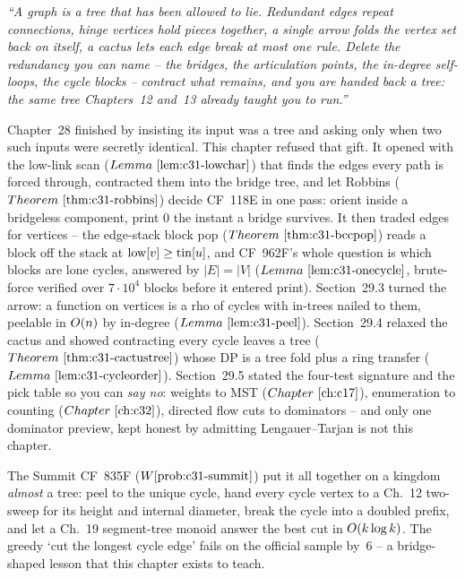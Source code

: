 \begin{lastword}
\emph{``A graph is a tree that has been allowed to lie.  Redundant edges repeat
connections, hinge vertices hold pieces together, a single arrow folds the vertex
set back on itself, a cactus lets each edge break at most one rule.  Delete the
redundancy you can name -- the bridges, the articulation points, the in-degree
self-loops, the cycle blocks -- contract what remains, and you are handed back a
tree: the same tree Chapters~12 and~13 already taught you to run.''}

\medskip
Chapter~28 finished by insisting its input was a tree and asking only when two
such inputs were secretly identical.  This chapter refused that gift.  It opened
with the low-link scan (\(\lemref{c31-lowchar}\)) that finds the edges every path is
forced through, contracted them into the bridge tree, and let Robbins
(\(\thmref{c31-robbins}\)) decide CF~118E in one pass: orient inside a bridgeless
component, print 0 the instant a bridge survives.  It then traded edges for
vertices -- the edge-stack block pop (\(\thmref{c31-bccpop}\)) reads a block off the
stack at \(\mathrm{low}[v]\ge\operatorname{tin}[u]\), and CF~962F's whole question is which blocks
are lone cycles, answered by \(|E|{=}|V|\) (\(\lemref{c31-onecycle}\), brute-force
verified over \(7\cdot 10^{4}\) blocks before it entered print).  Section~29.3 turned
the arrow: a function on vertices is a rho of cycles with in-trees nailed to them,
peelable in \(O(n)\) by in-degree (\(\lemref{c31-peel}\)).  Section~29.4 relaxed the
cactus and showed contracting every cycle leaves a tree (\(\thmref{c31-cactustree}\))
whose DP is a tree fold plus a ring transfer (\(\lemref{c31-cycleorder}\)).  Section~29.5
stated the four-test signature and the pick table so you can \emph{say no}: weights
to MST (\(\chref{c17}\)), enumeration to counting (\(\chref{c32}\)), directed flow cuts to
dominators -- and only one dominator preview, kept honest by admitting
Lengauer--Tarjan is not this chapter.

\medskip
The Summit CF~835F (\(\probref{c31-summit}\)) put it all together on a kingdom
\emph{almost} a tree: peel to the unique cycle, hand every cycle vertex to a Ch.~12
two-sweep for its height and internal diameter, break the cycle into a doubled
prefix, and let a Ch.~19 segment-tree monoid answer the best cut in
\(O(k\log k)\).  The greedy `cut the longest cycle edge' fails on the official
sample by~6 -- a bridge-shaped lesson that this chapter exists to teach.


\end{lastword}
